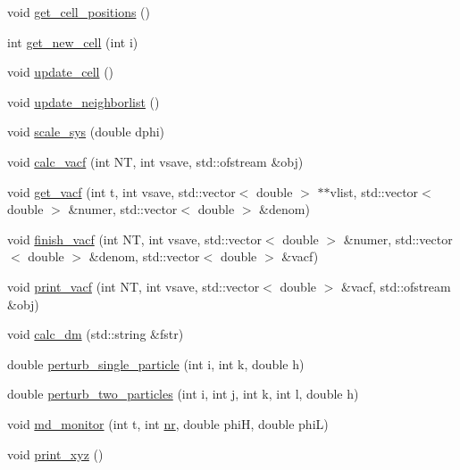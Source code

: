 \begin{DoxyCompactItemize}
\item 
void \mbox{\hyperlink{classpacking_ad9908dd91b3969dc8a5de39d8fcf66e3}{get\+\_\+cell\+\_\+positions}} ()
\item 
int \mbox{\hyperlink{classpacking_ac1311816bef393e5fccbbf61acefcb89}{get\+\_\+new\+\_\+cell}} (int i)
\item 
void \mbox{\hyperlink{classpacking_a944bd29a56c2811a991174ddb18aba63}{update\+\_\+cell}} ()
\item 
void \mbox{\hyperlink{classpacking_adf9ce1e5fca0258a3c93cd76652ecc50}{update\+\_\+neighborlist}} ()
\item 
void \mbox{\hyperlink{classpacking_a16f87413335e58b0ac9a9ded8742f32b}{scale\+\_\+sys}} (double dphi)
\item 
void \mbox{\hyperlink{classpacking_afaa70769d1b1faadad9e530f09fe26b9}{calc\+\_\+vacf}} (int NT, int vsave, std\+::ofstream \&obj)
\item 
void \mbox{\hyperlink{classpacking_ab91f79587ed1579f6754e956e7939597}{get\+\_\+vacf}} (int t, int vsave, std\+::vector$<$ double $>$ $\ast$$\ast$vlist, std\+::vector$<$ double $>$ \&numer, std\+::vector$<$ double $>$ \&denom)
\item 
void \mbox{\hyperlink{classpacking_a4eaacbf9a4212c3bdf61315317b21529}{finish\+\_\+vacf}} (int NT, int vsave, std\+::vector$<$ double $>$ \&numer, std\+::vector$<$ double $>$ \&denom, std\+::vector$<$ double $>$ \&vacf)
\item 
void \mbox{\hyperlink{classpacking_a50f911bdce5d1a3c81bd73eb3a77fd0e}{print\+\_\+vacf}} (int NT, int vsave, std\+::vector$<$ double $>$ \&vacf, std\+::ofstream \&obj)
\item 
void \mbox{\hyperlink{classpacking_ad87b894a228262a83190cae54f8a8bb2}{calc\+\_\+dm}} (std\+::string \&fstr)
\item 
double \mbox{\hyperlink{classpacking_a9e94b699c2cc7d52a74cd2e4a8642371}{perturb\+\_\+single\+\_\+particle}} (int i, int k, double h)
\item 
double \mbox{\hyperlink{classpacking_aa9d162db11496df9f1dd4696fe1924da}{perturb\+\_\+two\+\_\+particles}} (int i, int j, int k, int l, double h)
\item 
void \mbox{\hyperlink{classpacking_af2e5ff650c513fb8f69e0c1dd97a7ec7}{md\+\_\+monitor}} (int t, int \mbox{\hyperlink{classpacking_a31eede3d604c45fef6021170ee506c77}{nr}}, double phiH, double phiL)
\item 
void \mbox{\hyperlink{classpacking_a810b179015e89063c7af6e5e3588380c}{print\+\_\+xyz}} ()
\item 
$$
\end{DoxyCompactItemize}
